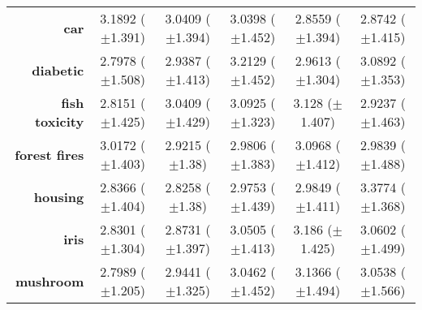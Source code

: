 \begin{table}[htb]
{\begin{tabular}{r|ccccc}
                  \textbf{car}                 & \cellcolor[rgb]{ .973,  .412,  .42}3.1892 ($\pm$1.391)  & \cellcolor[rgb]{ 1,  .922,  .518}3.0409 ($\pm$1.394)    & \cellcolor[rgb]{ 1,  .922,  .518}3.0398 ($\pm$1.452)    & \cellcolor[rgb]{ .388,  .745,  .482}2.8559 ($\pm$1.394) & \cellcolor[rgb]{ .447,  .761,  .482}2.8742 ($\pm$1.415) \\
                  \textbf{diabetic}            & \cellcolor[rgb]{ .388,  .745,  .482}2.7978 ($\pm$1.508) & \cellcolor[rgb]{ .914,  .894,  .51}2.9387 ($\pm$1.413)  & \cellcolor[rgb]{ .973,  .412,  .42}3.2129 ($\pm$1.452)  & \cellcolor[rgb]{ 1,  .922,  .518}2.9613 ($\pm$1.304)    & \cellcolor[rgb]{ .988,  .663,  .471}3.0892 ($\pm$1.353) \\
                  \textbf{fish toxicity}       & \cellcolor[rgb]{ .388,  .745,  .482}2.8151 ($\pm$1.425) & \cellcolor[rgb]{ 1,  .922,  .518}3.0409 ($\pm$1.429)    & \cellcolor[rgb]{ .984,  .62,  .463}3.0925 ($\pm$1.323)  & \cellcolor[rgb]{ .973,  .412,  .42}3.128 ($\pm$1.407)   & \cellcolor[rgb]{ .682,  .827,  .498}2.9237 ($\pm$1.463) \\
                  \textbf{forest fires}        & \cellcolor[rgb]{ .992,  .773,  .49}3.0172 ($\pm$1.403)  & \cellcolor[rgb]{ .388,  .745,  .482}2.9215 ($\pm$1.38)  & \cellcolor[rgb]{ .965,  .91,  .514}2.9806 ($\pm$1.383)  & \cellcolor[rgb]{ .973,  .412,  .42}3.0968 ($\pm$1.412)  & \cellcolor[rgb]{ 1,  .922,  .518}2.9839 ($\pm$1.488)    \\
                  \textbf{housing}             & \cellcolor[rgb]{ .431,  .757,  .482}2.8366 ($\pm$1.404) & \cellcolor[rgb]{ .388,  .745,  .482}2.8258 ($\pm$1.38)  & \cellcolor[rgb]{ 1,  .922,  .518}2.9753 ($\pm$1.439)    & \cellcolor[rgb]{ 1,  .91,  .518}2.9849 ($\pm$1.411)     & \cellcolor[rgb]{ .973,  .412,  .42}3.3774 ($\pm$1.368)  \\
                  \textbf{iris}                & \cellcolor[rgb]{ .388,  .745,  .482}2.8301 ($\pm$1.304) & \cellcolor[rgb]{ .506,  .776,  .486}2.8731 ($\pm$1.397) & \cellcolor[rgb]{ 1,  .922,  .518}3.0505 ($\pm$1.413)    & \cellcolor[rgb]{ .973,  .412,  .42}3.186 ($\pm$1.425)   & \cellcolor[rgb]{ 1,  .886,  .514}3.0602 ($\pm$1.499)    \\
                  \textbf{mushroom}            & \cellcolor[rgb]{ .388,  .745,  .482}2.7989 ($\pm$1.205) & \cellcolor[rgb]{ .745,  .847,  .502}2.9441 ($\pm$1.325) & \cellcolor[rgb]{ 1,  .922,  .518}3.0462 ($\pm$1.452)    & \cellcolor[rgb]{ .973,  .412,  .42}3.1366 ($\pm$1.494)  & \cellcolor[rgb]{ 1,  .882,  .51}3.0538 ($\pm$1.566)     \\

\end{tabular}}
\end{table}
